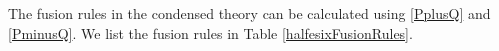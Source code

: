 \documentclass[12pt,a4paper]{article}
\newcommand{\tp}{\otimes}
\newcommand{\cc}{\mathbb{C}}
\newcommand{\mca}{\mathcal{A}}
\newcommand{\mcv}{\mathcal{V}}
\newcommand{\dave}[1]{{\color{ao(english)}\footnotesize{(DA) #1}}}
\newcommand{\ethan}[1]{{\color{amethyst}\footnotesize{(EL) #1}}}
\newcommand{\halfesix}{\frac{1}{2}\text{E}_6}
\begin{document}
The fusion rules in the condensed theory can be calculated using \ref{PplusQ} and \ref{PminusQ}. 
We list the fusion rules in Table \ref{halfesixFusionRules}. 

\end{document}
